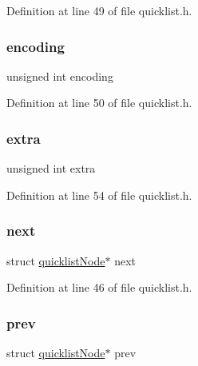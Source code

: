 Definition at line 49 of file quicklist.\+h.

\mbox{\label{structquicklist_node_a541253f13be71f2a40d23f98d3ac6d7d}} 
\subsubsection{\texorpdfstring{encoding}{encoding}}
{\footnotesize\ttfamily unsigned int encoding}



Definition at line 50 of file quicklist.\+h.

\mbox{\label{structquicklist_node_a660ceaa22bec21d59654a14bc0fde76e}} 
\subsubsection{\texorpdfstring{extra}{extra}}
{\footnotesize\ttfamily unsigned int extra}



Definition at line 54 of file quicklist.\+h.

\mbox{\label{structquicklist_node_aa4be5244c2097b8fc8bdf053a0793ac8}} 
\subsubsection{\texorpdfstring{next}{next}}
{\footnotesize\ttfamily struct \hyperlink{structquicklist_node}{quicklist\+Node}$\ast$ next}



Definition at line 46 of file quicklist.\+h.

\mbox{\label{structquicklist_node_abdcd96580045a4aa2d38c11a4671ed8d}} 
\subsubsection{\texorpdfstring{prev}{prev}}
{\footnotesize\ttfamily struct \hyperlink{structquicklist_node}{quicklist\+Node}$\ast$ prev}



